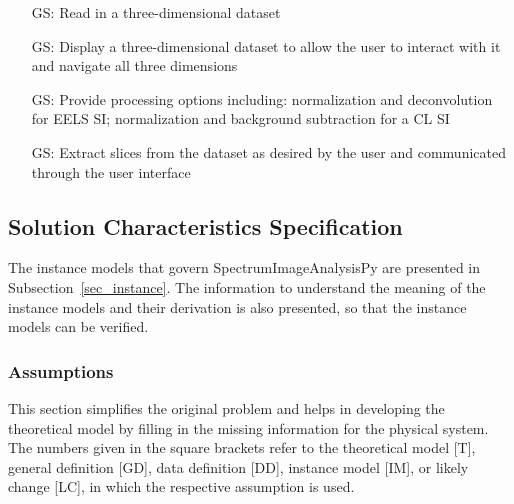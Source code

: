 \documentclass[12pt]{article}
\newcounter{goalnum} %
\newcommand{\progname}{SpectrumImageAnalysisPy} %
\begin{document}
\begin{itemize}

	\item[GS\refstepcounter{goalnum}\thegoalnum \label{G_meaningfulLabel}:] Read in a three-dimensional dataset
	\item[GS\refstepcounter{goalnum}\thegoalnum \label{G_meaningfulLabel}:] Display a three-dimensional dataset to allow the user to interact with it and navigate all three dimensions
	\item[GS\refstepcounter{goalnum}\thegoalnum \label{G_meaningfulLabel}:] Provide processing options including: normalization and deconvolution for EELS SI; normalization and background subtraction for a CL SI
	\item[GS\refstepcounter{goalnum}\thegoalnum \label{G_meaningfulLabel}:] Extract slices from the dataset as desired by the user and communicated through the user interface

\end{itemize}

\subsection{Solution Characteristics Specification}

The instance models that govern \progname{} are presented in
Subsection~\ref{sec_instance}.  The information to understand the meaning of the
instance models and their derivation is also presented, so that the instance
models can be verified.

\subsubsection{Assumptions}

This section simplifies the original problem and helps in developing the
theoretical model by filling in the missing information for the physical
system. The numbers given in the square brackets refer to the theoretical model
[T], general definition [GD], data definition [DD], instance model [IM], or
likely change [LC], in which the respective assumption is used.
\end{document}
